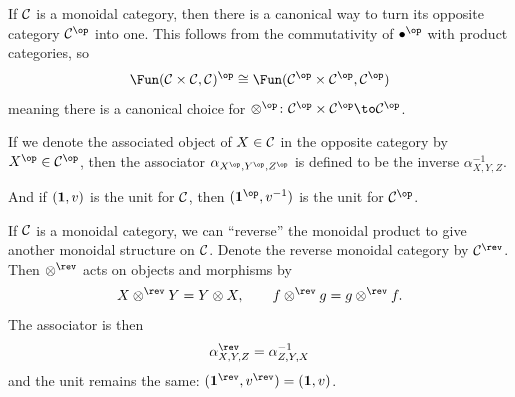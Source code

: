 \eexam

\bexam

    If ${{\cal C}}$ is a monoidal category, then there is a canonical way to turn its opposite category $\C^\op$ into one.
    This follows from the commutativity of $\bul^\op$ with product categories, so
    $$ \Fun(\C\times\C,\C)^\op \cong \Fun(\C^\op\times\C^\op,\C^\op) $$
    meaning there is a canonical choice for $\otimes^\op\colon\C^\op\times\C^\op\to\C^\op$.

    If we denote the associated object of $X\in{{\cal C}}$ in the opposite category by $X^\op\in\C^\op$, then the associator $\alpha_{X^\op,Y^\op,Z^\op}$ is defined to be
    the inverse $\alpha_{X,Y,Z}^{-1}$.

    And if $({\bf1},v)$ is the unit for ${{\cal C}}$, then $(\1^\op,v^{-1})$ is the unit for $\C^\op$.

\eexam

\bexam

    If ${{\cal C}}$ is a monoidal category, we can ``reverse'' the monoidal product to give another monoidal structure on ${{\cal C}}$.
    Denote the reverse monoidal category by $\C^\rev$.
    Then $\otimes^\rev$ acts on objects and morphisms by
    $$ X\otimes^\rev Y = Y\otimes X,\qquad f\otimes^\rev g = g\otimes^\rev f . $$
    The associator is then
    $$ \alpha^\rev_{X,Y,Z} = \alpha_{Z,Y,X}^{-1} $$
    and the unit remains the same: $(\1^\rev,v^\rev)=(\1,v)$.

\eexam

